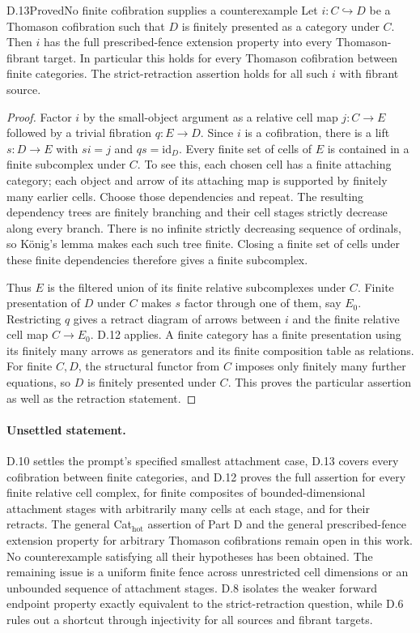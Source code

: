 \begin{claim}{D.13}{Proved}{No finite cofibration supplies a counterexample}
Let $i:C\hookrightarrow D$ be a Thomason cofibration such that $D$ is finitely presented as a category under $C$. Then $i$ has the full prescribed-fence extension property into every Thomason-fibrant target. In particular this holds for every Thomason cofibration between finite categories. The strict-retraction assertion holds for all such $i$ with fibrant source.
\end{claim}
\begin{proof}
Factor $i$ by the small-object argument as a relative cell map $j:C\to E$ followed by a trivial fibration $q:E\to D$. Since $i$ is a cofibration, there is a lift $s:D\to E$ with $si=j$ and $qs=\mathrm{id}_D$. Every finite set of cells of $E$ is contained in a finite subcomplex under $C$. To see this, each chosen cell has a finite attaching category; each object and arrow of its attaching map is supported by finitely many earlier cells. Choose those dependencies and repeat. The resulting dependency trees are finitely branching and their cell stages strictly decrease along every branch. There is no infinite strictly decreasing sequence of ordinals, so K\"onig's lemma makes each such tree finite. Closing a finite set of cells under these finite dependencies therefore gives a finite subcomplex.

Thus $E$ is the filtered union of its finite relative subcomplexes under $C$. Finite presentation of $D$ under $C$ makes $s$ factor through one of them, say $E_0$. Restricting $q$ gives a retract diagram of arrows between $i$ and the finite relative cell map $C\to E_0$. D.12 applies. A finite category has a finite presentation using its finitely many arrows as generators and its finite composition table as relations. For finite $C,D$, the structural functor from $C$ imposes only finitely many further equations, so $D$ is finitely presented under $C$. This proves the particular assertion as well as the retraction statement.
\end{proof}

\paragraph{Unsettled statement.}
D.10 settles the prompt's specified smallest attachment case, D.13 covers every cofibration between finite categories, and D.12 proves the full assertion for every finite relative cell complex, for finite composites of bounded-dimensional attachment stages with arbitrarily many cells at each stage, and for their retracts. The general Cat$_{\mathrm{hot}}$ assertion of Part D and the general prescribed-fence extension property for arbitrary Thomason cofibrations remain open in this work. No counterexample satisfying all their hypotheses has been obtained. The remaining issue is a uniform finite fence across unrestricted cell dimensions or an unbounded sequence of attachment stages. D.8 isolates the weaker forward endpoint property exactly equivalent to the strict-retraction question, while D.6 rules out a shortcut through injectivity for all sources and fibrant targets.
